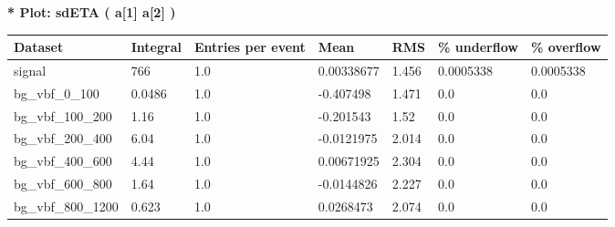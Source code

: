 \documentclass[a4paper, 10pt]{article}
\begin{document}
\textbf{* Plot: sdETA ( a[1] a[2] ) }\\
   \begin{table}[H]
  \begin{center}
    \begin{tabular}{|m{23.0mm}|m{23.0mm}|m{18.0mm}|m{19.0mm}|m{19.0mm}|m{19.0mm}|m{19.0mm}|}
      \hline
      {\cellcolor{yellow}         Dataset}& {\cellcolor{yellow}         Integral}& {\cellcolor{yellow}         Entries per event}& {\cellcolor{yellow}         Mean}& {\cellcolor{yellow}         RMS}& {\cellcolor{yellow}         \% underflow}& {\cellcolor{yellow}         \% overflow}\\
      \hline
      {\cellcolor{white}         signal}& {\cellcolor{white}         766}& {\cellcolor{white}         1.0}& {\cellcolor{white}         0.00338677}& {\cellcolor{white}         1.456}& {\cellcolor{green}         0.0005338}& {\cellcolor{green}         0.0005338}\\
      \hline
      {\cellcolor{white}         bg\_vbf\_0\_100}& {\cellcolor{white}         0.0486}& {\cellcolor{white}         1.0}& {\cellcolor{white}         -0.407498}& {\cellcolor{white}         1.471}& {\cellcolor{green}         0.0}& {\cellcolor{green}         0.0}\\
      \hline
      {\cellcolor{white}         bg\_vbf\_100\_200}& {\cellcolor{white}         1.16}& {\cellcolor{white}         1.0}& {\cellcolor{white}         -0.201543}& {\cellcolor{white}         1.52}& {\cellcolor{green}         0.0}& {\cellcolor{green}         0.0}\\
      \hline
      {\cellcolor{white}         bg\_vbf\_200\_400}& {\cellcolor{white}         6.04}& {\cellcolor{white}         1.0}& {\cellcolor{white}         -0.0121975}& {\cellcolor{white}         2.014}& {\cellcolor{green}         0.0}& {\cellcolor{green}         0.0}\\
      \hline
      {\cellcolor{white}         bg\_vbf\_400\_600}& {\cellcolor{white}         4.44}& {\cellcolor{white}         1.0}& {\cellcolor{white}         0.00671925}& {\cellcolor{white}         2.304}& {\cellcolor{green}         0.0}& {\cellcolor{green}         0.0}\\
      \hline
      {\cellcolor{white}         bg\_vbf\_600\_800}& {\cellcolor{white}         1.64}& {\cellcolor{white}         1.0}& {\cellcolor{white}         -0.0144826}& {\cellcolor{white}         2.227}& {\cellcolor{green}         0.0}& {\cellcolor{green}         0.0}\\
      \hline
      {\cellcolor{white}         bg\_vbf\_800\_1200}& {\cellcolor{white}         0.623}& {\cellcolor{white}         1.0}& {\cellcolor{white}         0.0268473}& {\cellcolor{white}         2.074}& {\cellcolor{green}         0.0}& {\cellcolor{green}         0.0}\\

\end{tabular}
\end{center}
\end{table}
\end{document}
